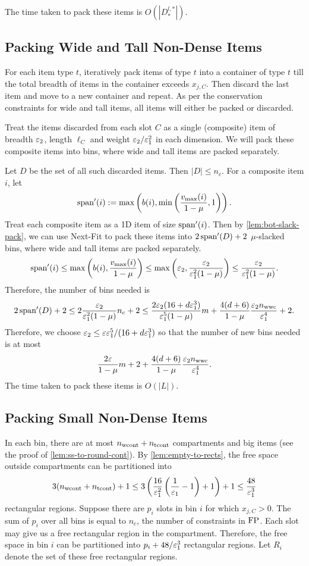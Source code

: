The time taken to pack these items is $O(|D^{l,*}_{*}|)$.

\subsection{Packing Wide and Tall Non-Dense Items}
\label{sec:algo:pack-wide}

For each item type $t$, iteratively pack items of type $t$ into a container of type $t$
till the total breadth of items in the container exceeds $x_{j,C}$. Then discard
the last item and move to a new container and repeat. As per the conservation constraints
for wide and tall items, all items will either be packed or discarded.

Treat the items discarded from each slot $C$ as a single (composite) item of breadth $\varepsilon_2$,
length $\ell_C$ and weight $\varepsilon_2/\varepsilon_1^2$ in each dimension.
We will pack these composite items into bins, where wide and tall items are packed separately.

Let $D$ be the set of all such discarded items. Then $|D| \le n_c$.
For a composite item $i$, let
\[ \operatorname{span}'(i) := \max\left(b(i), \min\left(\frac{v_{\max}(i)}{1-\mu}, 1\right)\right). \]
Treat each composite item as a 1D item of size $\operatorname{span}'(i)$.
Then by \cref{lem:bot-slack-pack}, we can use Next-Fit to pack these items
into $2\operatorname{span}'(D) + 2$ $\mu$-slacked bins, where wide and tall items are packed separately.
\[ \operatorname{span}'(i) \le \max\left(b(i), \frac{v_{\max}(i)}{1-\mu}\right)
\le \max\left(\varepsilon_2, \frac{\varepsilon_2}{\varepsilon_1^2(1-\mu)}\right)
\le \frac{\varepsilon_2}{\varepsilon_1^2(1-\mu)}. \]
Therefore, the number of bins needed is
\[ 2\operatorname{span}'(D) + 2 \le 2\frac{\varepsilon_2}{\varepsilon_1^2(1-\mu)} n_c + 2
\le \frac{2\varepsilon_2(16 + d\varepsilon_1^3)}{\varepsilon_1^5(1-\mu)}m
    + \frac{4(d+6)}{1-\mu} \frac{\varepsilon_2 n_{\mathrm{wwc}}}{\varepsilon_1^4} + 2. \]
Therefore, we choose
$\varepsilon_2 \le \varepsilon\varepsilon_1^5/(16 + d\varepsilon_1^3)$
so that the number of new bins needed is at most
\[ \frac{2\varepsilon}{1-\mu}m + 2 + \frac{4(d+6)}{1-\mu} \frac{\varepsilon_2 n_{\mathrm{wwc}}}{\varepsilon_1^4}. \]
The time taken to pack these items is $O(|L|)$.

\subsection{Packing Small Non-Dense Items}
\label{sec:algo:pack-small}

In each bin, there are at most $n_{\mathrm{wcont}} + n_{\mathrm{tcont}}$ compartments and big items
(see the proof of \cref{lem:ss-to-round-cont}).
By \cref{lem:empty-to-rects}, the free space outside compartments can be partitioned into
\[ 3(n_{\mathrm{wcont}} + n_{\mathrm{tcont}}) + 1
\le 3\left(\frac{16}{\varepsilon_1^2}\left(\frac{1}{\varepsilon_1} - 1\right) + 1\right) + 1
\le \frac{48}{\varepsilon_1^3} \] rectangular regions.
Suppose there are $p_i$ slots in bin $i$ for which $x_{j,C} > 0$.
The sum of $p_i$ over all bins is equal to $n_c$, the number of constraints in $\operatorname{FP}$.
Each slot may give us a free rectangular region in the compartment.
Therefore, the free space in bin $i$ can be partitioned into $p_i + 48/\varepsilon_1^3$
rectangular regions. Let $R_i$ denote the set of these free rectangular regions.

